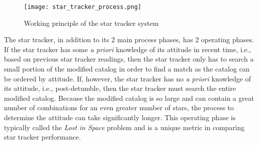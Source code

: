 \begin{figure}[h]
    \begin{adjustbox}{center}
        \texttt{[image: star\_tracker\_process.png]}
    \end{adjustbox}
    \caption{Working principle of the star tracker system \cite{rolling_shutter_errors}}
\end{figure}

\par \qquad The star tracker, in addition to its 2 main process phases, has 2 operating phases.
If the star tracker has some \emph{a priori} knowledge of its attitude in recent time, i.e., based on previous star tracker readings, then the star tracker only has to search a small portion of the modified catalog in order to find a match as the catalog can be ordered by attitude.
If, however, the star tracker has no \emph{a priori} knowledge of its attitude, i.e., post-detumble, then the star tracker must search the entire modified catalog.
Because the modified catalog is so large and can contain a great number of combinations for an even greater number of stars, the process to determine the attitude can take significantly longer.
This operating phase is typically called the \emph{Lost in Space} problem and is a unique metric in comparing star tracker performance.

